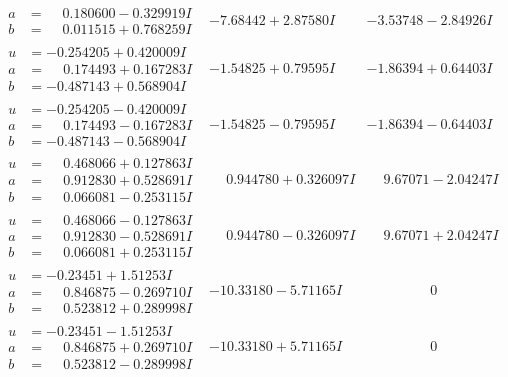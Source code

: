 \documentclass[1p]{elsarticle_modified}
\theoremstyle{definition}
\begin{document}
$$\begin{array}{c|c|c}
\begin{aligned}
a &= \phantom{-}0.180600 - 0.329919 I \\
b &= \phantom{-}0.011515 + 0.768259 I\end{aligned}
 & -7.68442 + 2.87580 I & -3.53748 - 2.84926 I \\ \hline\begin{aligned}
u &= -0.254205 + 0.420009 I \\
a &= \phantom{-}0.174493 + 0.167283 I \\
b &= -0.487143 + 0.568904 I\end{aligned}
 & -1.54825 + 0.79595 I & -1.86394 + 0.64403 I \\ \hline\begin{aligned}
u &= -0.254205 - 0.420009 I \\
a &= \phantom{-}0.174493 - 0.167283 I \\
b &= -0.487143 - 0.568904 I\end{aligned}
 & -1.54825 - 0.79595 I & -1.86394 - 0.64403 I \\ \hline\begin{aligned}
u &= \phantom{-}0.468066 + 0.127863 I \\
a &= \phantom{-}0.912830 + 0.528691 I \\
b &= \phantom{-}0.066081 - 0.253115 I\end{aligned}
 & \phantom{-}0.944780 + 0.326097 I & \phantom{-}9.67071 - 2.04247 I \\ \hline\begin{aligned}
u &= \phantom{-}0.468066 - 0.127863 I \\
a &= \phantom{-}0.912830 - 0.528691 I \\
b &= \phantom{-}0.066081 + 0.253115 I\end{aligned}
 & \phantom{-}0.944780 - 0.326097 I & \phantom{-}9.67071 + 2.04247 I \\ \hline\begin{aligned}
u &= -0.23451 + 1.51253 I \\
a &= \phantom{-}0.846875 - 0.269710 I \\
b &= \phantom{-}0.523812 + 0.289998 I\end{aligned}
 & -10.33180 - 5.71165 I & \phantom{-0.000000 } 0 \\ \hline\begin{aligned}
u &= -0.23451 - 1.51253 I \\
a &= \phantom{-}0.846875 + 0.269710 I \\
b &= \phantom{-}0.523812 - 0.289998 I\end{aligned}
 & -10.33180 + 5.71165 I & \phantom{-0.000000 } 0 \\ \hline\begin{aligned}

\end{aligned}
\end{array}$$
\end{document}
